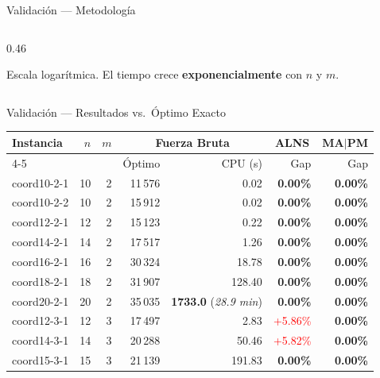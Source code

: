 \documentclass[aspectratio=169,10pt]{beamer}
\begin{document}
\begin{frame}{Validación --- Metodología}
\begin{columns}[T,onlytextwidth]
\begin{column}{0.46\textwidth}
\begin{center}
      \end{center}
      \small Escala logarítmica. El tiempo crece \textbf{exponencialmente}
      con $n$ y $m$.
    \end{column}
  \end{columns}
\end{frame}

\begin{frame}{Validación --- Resultados vs.\ Óptimo Exacto}
  \begin{center}\footnotesize
  \begin{tabular}{lrr|rr|rr}
    \toprule
    Instancia & $n$ & $m$ &
    \multicolumn{2}{c|}{Fuerza Bruta} &
    \multicolumn{1}{c}{ALNS} &
    \multicolumn{1}{c}{MA$|$PM} \\
    \cmidrule(lr){4-5}
    & & & Óptimo & CPU (s) & Gap & Gap \\
    \midrule
    coord10-2-1 & 10 & 2 & 11\,576 & 0.02   & \textbf{0.00\%} & \textbf{0.00\%} \\
    coord10-2-2 & 10 & 2 & 15\,912 & 0.02   & \textbf{0.00\%} & \textbf{0.00\%} \\
    coord12-2-1 & 12 & 2 & 15\,123 & 0.22   & \textbf{0.00\%} & \textbf{0.00\%} \\
    coord14-2-1 & 14 & 2 & 17\,517 & 1.26   & \textbf{0.00\%} & \textbf{0.00\%} \\
    coord16-2-1 & 16 & 2 & 30\,324 & 18.78  & \textbf{0.00\%} & \textbf{0.00\%} \\
    coord18-2-1 & 18 & 2 & 31\,907 & 128.40 & \textbf{0.00\%} & \textbf{0.00\%} \\
    \rowcolor{yellow!25}
    coord20-2-1 & 20 & 2 & 35\,035 & \textbf{1733.0} (\textit{28.9 min}) & \textbf{0.00\%} & \textbf{0.00\%} \\
    \midrule
    coord12-3-1 & 12 & 3 & 17\,497 & 2.83   & \textcolor{red}{+5.86\%} & \textbf{0.00\%} \\
    coord14-3-1 & 14 & 3 & 20\,288 & 50.46  & \textcolor{red}{+5.82\%} & \textbf{0.00\%} \\
    coord15-3-1 & 15 & 3 & 21\,139 & 191.83 & \textbf{0.00\%} & \textbf{0.00\%} \\

\end{tabular}
\end{center}
\end{frame}
\end{document}
